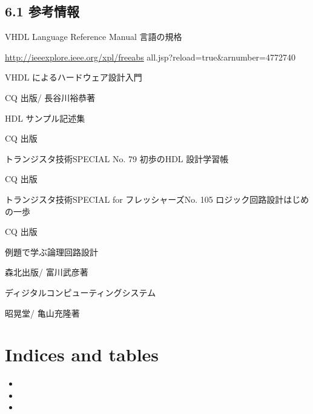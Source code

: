 \documentclass[letterpaper,10pt,dvipdfmx]{sphinxmanual}
\begin{document}
\section{6.1 参考情報}
\label{06_appendix:id2}
VHDL Language Reference Manual 言語の規格

\href{http://ieeexplore.ieee.org/xpl/freeabs}{http://ieeexplore.ieee.org/xpl/freeabs} all.jsp?reload=true\&arnumber=4772740

VHDL によるハードウェア設計入門

CQ 出版/ 長谷川裕恭著

HDL サンプル記述集

CQ 出版

トランジスタ技術SPECIAL No. 79 初歩のHDL 設計学習帳

CQ 出版

トランジスタ技術SPECIAL for フレッシャーズNo. 105 ロジック回路設計はじめの一歩

CQ 出版

例題で学ぶ論理回路設計

森北出版/ 富川武彦著

ディジタルコンピューティングシステム

昭晃堂/ 亀山充隆著


\chapter{Indices and tables}
\label{index:indices-and-tables}\begin{itemize}
\item {} 

\item {} 

\item {} 

\end{itemize}



\renewcommand{\indexname}{索引}
\printindex
\end{document}
